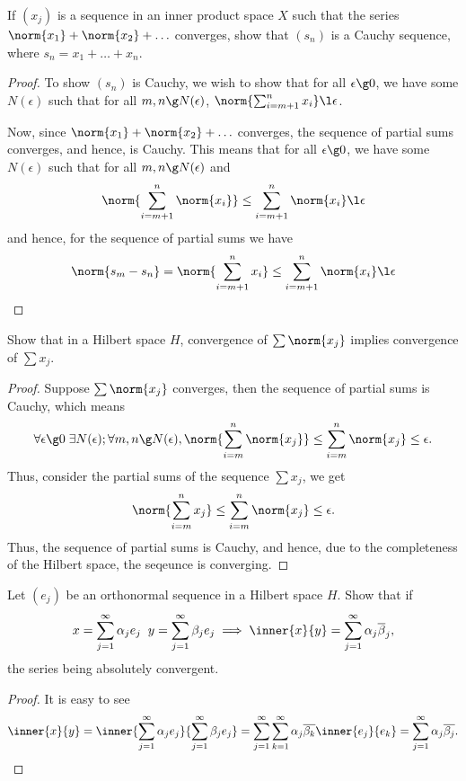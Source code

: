 \begin{question}
    If $(x_j)$ is a sequence in an inner product space $X$ such that the series $\norm{x_1} + \norm{x_2} + \ldots$ converges, show that $(s_n)$ is a Cauchy sequence, where $s_n = x_1 + \ldots + x_n$.
    \label{section3.5-4}
\end{question}
\begin{proof}
    To show $(s_n)$ is Cauchy, we wish to show that for all $\epsilon \g 0$, we have some $N(\epsilon)$ such that for all $m,n \g N(\epsilon)$, $\norm{\sum_{i=m+1}^n x_i} \l \epsilon$.

    Now, since $\norm{x_1} + \norm{x_2} + \ldots$ converges, the sequence of partial sums converges, and hence, is Cauchy. This means that for all $\epsilon \g 0$, we have some $N(\epsilon)$ such that for all $m,n \g N(\epsilon)$ and
    \[\norm{\sum_{i=m+1}^n \norm{x_i}} \leq \sum_{i=m+1}^n \norm{x_i} \l \epsilon\]
    and hence, for the sequence of partial sums we have
    \[\norm{s_m - s_n}  = \norm{\sum_{i=m+1}^n x_i} \leq \sum_{i=m+1}^n \norm{x_i} \l \epsilon\]
\end{proof}

\begin{question}
    Show that in a Hilbert space $H$, convergence of $\sum \norm{x_j}$ implies convergence of $\sum x_j$.
    \label{section3.5-5}
\end{question}
\begin{proof}
    Suppose $\sum \norm{x_j}$ converges, then the sequence of partial sums is Cauchy, which means
    \[\forall \epsilon \g 0 \; \exists N(\epsilon) ; \forall m,n \g N(\epsilon) ,\norm{\sum_{i=m}^n \norm{x_j}} \leq \sum_{i=m}^n \norm{x_j} \leq \epsilon.\]
    Thus, consider the partial sums of the sequence $\sum x_j$, we get
    \[\norm{\sum_{i=m}^n x_j} \leq \sum_{i=m}^n \norm{x_j} \leq \epsilon.\]
    Thus, the sequence of partial sums is Cauchy, and hence, due to the completeness of the Hilbert space, the seqeunce is converging.
\end{proof}


\begin{question}
    Let $(e_j)$ be an orthonormal sequence in a Hilbert space $H$. Show that if 
    \[x = \sum_{j=1}^\infty \alpha_j e_j \;\; y = \sum_{j=1}^\infty \beta_j e_j \implies \inner{x}{y} = \sum_{j=1}^\infty \alpha_j \overline{\beta}_j,\]
    the series being absolutely convergent.
    \label{section3.5-6}
\end{question}
\begin{proof}
    It is easy to see
    \[\inner{x}{y} = \inner{\sum_{j=1}^\infty \alpha_j e_j}{\sum_{j=1}^\infty \beta_j e_j} = \sum_{j=1}^\infty\sum_{k=1}^\infty \alpha_j \overline{\beta_k} \inner{e_j}{e_k} = \sum_{j=1}^\infty \alpha_j \overline{\beta_j}.\]
\end{proof}

